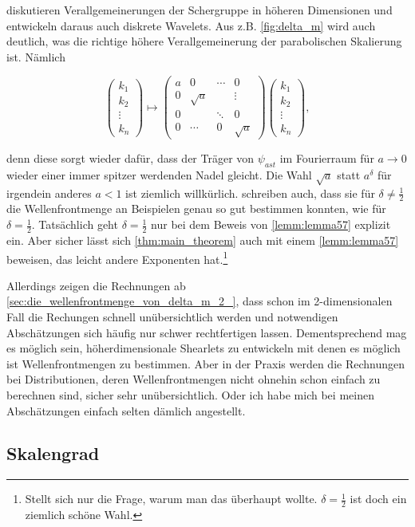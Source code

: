 \textcite{Guo2006} diskutieren Verallgemeinerungen der Schergruppe in höheren Dimensionen und entwickeln daraus auch diskrete Wavelets. Aus z.B. \cref{fig:delta_m} wird auch deutlich, was die richtige höhere Verallgemeinerung der parabolischen Skalierung ist. Nämlich

\begin{equation*}
\begin{pmatrix}
k_1 \\ k_2 \\ \vdots \\ k_n
\end{pmatrix}
\mapsto
\begin{pmatrix}
	a & 0 		& \cdots & 0\\
	0 & \sqrt a & 		 & 	\vdots\\
	0 & 			& \ddots & 0 \\
	0 & \cdots  & 	0    & \sqrt{a}
\end{pmatrix}
\begin{pmatrix}
k_1 \\ k_2 \\ \vdots \\ k_n
\end{pmatrix},
\end{equation*}

denn diese sorgt wieder dafür, dass der Träger von $\psi_{ast}$ im Fourierraum für $a \to 0$ wieder einer immer spitzer werdenden Nadel gleicht. Die Wahl $\sqrt{a}$ statt $a^\delta$ für irgendein anderes $a<1$ ist ziemlich willkürlich. \textcite{Kutyniok2008} schreiben auch, dass sie für $\delta \neq \frac{1}{2}$ die Wellenfrontmenge an Beispielen genau so gut bestimmen konnten, wie für $\delta = \frac{1}{2}$. Tatsächlich geht $\delta = \frac{1}{2}$ nur bei dem Beweis von \cref{lemm:lemma57} explizit ein. Aber sicher lässt sich \cref{thm:main_theorem} auch mit einem \cref{lemm:lemma57} beweisen, das leicht andere Exponenten hat.\footnote{Stellt sich nur die Frage, warum man das überhaupt wollte. $\delta = \frac{1}{2}$ ist doch ein ziemlich schöne Wahl.}

Allerdings zeigen die Rechnungen ab \cref{sec:die_wellenfrontmenge_von_delta_m_2_}, dass schon im 2-dimensionalen Fall die Rechungen schnell unübersichtlich werden und notwendigen Abschätzungen sich häufig nur schwer rechtfertigen lassen. Dementsprechend mag es möglich sein, höherdimensionale Shearlets zu entwickeln mit denen es möglich ist Wellenfrontmengen zu bestimmen. Aber in der Praxis werden die Rechnungen bei Distributionen, deren Wellenfrontmengen nicht ohnehin schon einfach zu berechnen sind, sicher sehr unübersichtlich. Oder ich habe mich bei meinen Abschätzungen einfach selten dämlich angestellt.


\subsection{Skalengrad}



